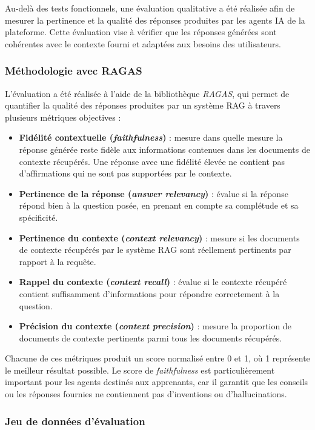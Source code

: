 Au-delà des tests fonctionnels, une évaluation qualitative a été réalisée afin de mesurer la pertinence et la qualité des réponses produites par les agents IA de la plateforme. Cette évaluation vise à vérifier que les réponses générées sont cohérentes avec le contexte fourni et adaptées aux besoins des utilisateurs.

\subsubsection{Méthodologie avec RAGAS}

L'évaluation a été réalisée à l'aide de la bibliothèque \textit{RAGAS}, qui permet de quantifier la qualité des réponses produites par un système RAG à travers plusieurs métriques objectives :

\begin{itemize}
    \item \textbf{Fidélité contextuelle (\textit{faithfulness})} : mesure dans quelle mesure la réponse générée reste fidèle aux informations contenues dans les documents de contexte récupérés. Une réponse avec une fidélité élevée ne contient pas d'affirmations qui ne sont pas supportées par le contexte.
    \item \textbf{Pertinence de la réponse (\textit{answer relevancy})} : évalue si la réponse répond bien à la question posée, en prenant en compte sa complétude et sa spécificité.
    \item \textbf{Pertinence du contexte (\textit{context relevancy})} : mesure si les documents de contexte récupérés par le système RAG sont réellement pertinents par rapport à la requête.
    \item \textbf{Rappel du contexte (\textit{context recall})} : évalue si le contexte récupéré contient suffisamment d'informations pour répondre correctement à la question.
    \item \textbf{Précision du contexte (\textit{context precision})} : mesure la proportion de documents de contexte pertinents parmi tous les documents récupérés.
\end{itemize}

Chacune de ces métriques produit un score normalisé entre 0 et 1, où 1 représente le meilleur résultat possible. Le score de \textit{faithfulness} est particulièrement important pour les agents destinés aux apprenants, car il garantit que les conseils ou les réponses fournies ne contiennent pas d'inventions ou d'hallucinations.

\subsubsection{Jeu de données d'évaluation}

